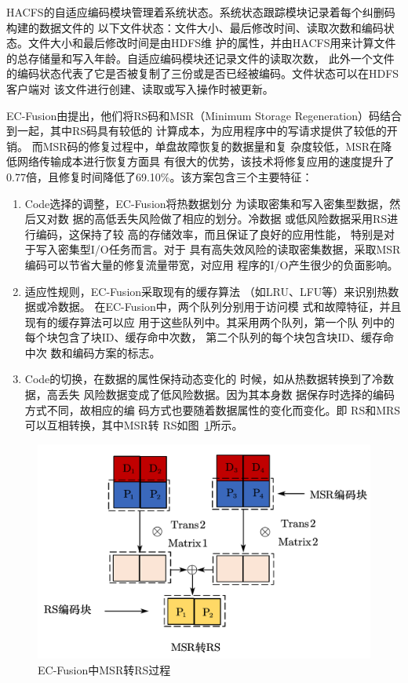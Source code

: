 HACFS的自适应编码模块管理着系统状态。系统状态跟踪模块记录着每个纠删码构建的数据文件的
以下文件状态：文件大小、最后修改时间、读取次数和编码状态。文件大小和最后修改时间是由HDFS维
护的属性，并由HACFS用来计算文件的总存储量和写入年龄。自适应编码模块还记录文件的读取次数，
此外一个文件的编码状态代表了它是否被复制了三份或是否已经被编码。文件状态可以在HDFS客户端对
该文件进行创建、读取或写入操作时被更新。


EC-Fusion由\citet{qiu2020ec}提出，他们将RS码和MSR（Minimum Storage
Regeneration）码结合到一起，其中RS码具有较低的
计算成本，为应用程序中的写请求提供了较低的开销。
而MSR码的修复过程中，单盘故障恢复的数据量和复
杂度较低，MSR在降低网络传输成本进行恢复方面具
有很大的优势，该技术将修复应用的速度提升了0.77倍，且修复时间降低了69.10\%。该方案包含三个主要特征：

\begin{enumerate}
	\item Code选择的调整，EC-Fusion将热数据划分
	      为读取密集和写入密集型数据，然后又对数
	      据的高低丢失风险做了相应的划分。冷数据
	      或低风险数据采用RS进行编码，这保持了较
	      高的存储效率，而且保证了良好的应用性能，
	      特别是对于写入密集型I/O任务而言。对于
	      具有高失效风险的读取密集数据，采取MSR
	      编码可以节省大量的修复流量带宽，对应用
	      程序的I/O产生很少的负面影响。
	\item 适应性规则，EC-Fusion采取现有的缓存算法
	      （如LRU、LFU等）来识别热数据或冷数据。
	      在EC-Fusion中，两个队列分别用于访问模
	      式和故障特征，并且现有的缓存算法可以应
	      用于这些队列中。其采用两个队列，第一个队
	      列中的每个块包含了块ID、缓存命中次数，
	      第二个队列的每个块包含块ID、缓存命中次
	      数和编码方案的标志。
	\item Code的切换，在数据的属性保持动态变化的
	      时候，如从热数据转换到了冷数据，高丢失
	      风险数据变成了低风险数据。因为其本身数
	      据保存时选择的编码方式不同，故相应的编
	      码方式也要随着数据属性的变化而变化。即
	      RS和MRS可以互相转换，其中MSR转
	      RS如图~\ref{fig:con-2.7}所示。
\end{enumerate}

\begin{figure}[htbp]
	\centering
	\includegraphics [scale=0.5]{figures/2.7.pdf}
	\caption{EC-Fusion中MSR转RS过程}
	\label{fig:con-2.7}
\end{figure}

